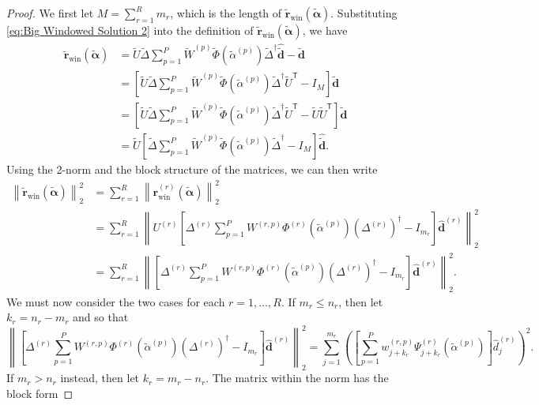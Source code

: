 \documentclass[12pt]{article}
\newcommand{\dVec}{\mathbf{d}}	%
\newcommand{\rVec}{\mathbf{r}}	%
\newcommand{\trans}[1]{{#1}^\mathsf{T}}	%
\newcommand{\pinv}[1]{{#1}^\dagger}	%
\newcommand{\dft}[1]{\widehat{#1}}	%
\newcommand{\regparam}{\alpha}  %
\newcommand{\regparamVec}{\bm{\regparam}}   %
\newcommand{\regparamBig}{\widetilde{\regparam}}   %
\newcommand{\regparamVecBig}{\widetilde{\regparamVec}}   %
\newcommand{\rBig}{\widetilde{\rVec}}	%
\newcommand{\rWinBig}{\rBig_{\text{win}}}	%
\newcommand{\dBig}{\widetilde{\dVec}}	%
\newcommand{\svd}[1]{\widehat{#1}}	%
\newcommand{\rWin}{\rVec_{\text{win}}}	%
\begin{document}
\begin{proof}
We first let $M = \sum_{r=1}^{R} m_r$, which is the length of $\rWinBig(\regparamVecBig)$. Substituting \eqref{eq:Big Windowed Solution 2} into the definition of $\rWinBig(\regparamVecBig)$, we have
\begin{align*}
    \rWinBig(\regparamVecBig) &= \widetilde{U}\widetilde{\Delta}\sum_{p=1}^{P} \widetilde{W}^{(p)}\widetilde{\Phi}\left(\widetilde{\regparam}^{(p)}\right)\pinv{\widetilde{\Delta}}\dft{\dBig} - \dBig \\
    &= \left[\widetilde{U}\widetilde{\Delta}\sum_{p=1}^{P} \widetilde{W}^{(p)}\widetilde{\Phi}\left(\widetilde{\regparam}^{(p)}\right)\pinv{\widetilde{\Delta}}\trans{\widetilde{U}} - I_M\right]\dBig \\
    &= \left[\widetilde{U}\widetilde{\Delta}\sum_{p=1}^{P} \widetilde{W}^{(p)}\widetilde{\Phi}\left(\widetilde{\regparam}^{(p)}\right)\pinv{\widetilde{\Delta}}\trans{\widetilde{U}} - \widetilde{U}\trans{\widetilde{U}}\right]\dBig \\
    &= \widetilde{U}\left[\widetilde{\Delta}\sum_{p=1}^{P} \widetilde{W}^{(p)}\widetilde{\Phi}\left(\widetilde{\regparam}^{(p)}\right)\pinv{\widetilde{\Delta}} - I_M\right]\svd{\dBig}.
\end{align*}
Using the 2-norm and the block structure of the matrices, we can then write
\begin{align*}
    \left\|\rWinBig(\regparamVecBig)\right\|_2^2 &= \sum_{r=1}^{R}\left\|\rWin^{(r)}(\regparamVecBig)\right\|_2^2 \\
    &= \sum_{r=1}^{R} \left\|U^{(r)}\left[\Delta^{(r)}\sum_{p=1}^{P} W^{(r,p)}\Phi^{(r)}\left(\widetilde{\regparam}^{(p)}\right)\pinv{\left(\Delta^{(r)}\right)} - I_{m_r}\right]\svd{\dVec}^{(r)}\right\|_2^2 \\
    &= \sum_{r=1}^{R} \left\|\left[\Delta^{(r)}\sum_{p=1}^{P} W^{(r,p)}\Phi^{(r)}\left(\widetilde{\regparam}^{(p)}\right)\pinv{\left(\Delta^{(r)}\right)} - I_{m_r}\right]\svd{\dVec}^{(r)}\right\|_2^2.
\end{align*}
We must now consider the two cases for each $r = 1,\ldots,R$. If $m_r \leq n_r$, then let $k_r = n_r - m_r$ and so that 
\[\left\|\left[\Delta^{(r)}\sum_{p=1}^{P} W^{(r,p)}\Phi^{(r)}\left(\widetilde{\regparam}^{(p)}\right)\pinv{\left(\Delta^{(r)}\right)} - I_{m_r}\right]\svd{\dVec}^{(r)}\right\|_2^2 = \sum_{j=1}^{m_r} \left(\left[\sum_{p=1}^{P} w_{j+{k_r}}^{(r,p)}\Psi_{j+{k_r}}^{(r)}\left(\regparamBig^{(p)}\right)\right] \hat{d}_j^{(r)}\right)^2.\]
If $m_r > n_r$ instead, then let $k_r = m_r - n_r$. The matrix within the norm has the block form

\end{proof}
\end{document}
